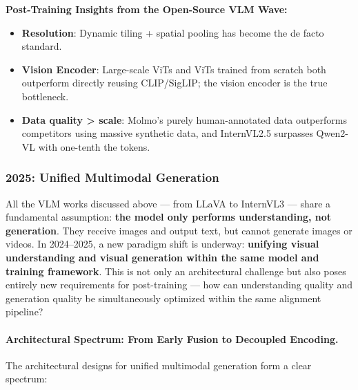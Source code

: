 \begin{solutionbox}
\textbf{Post-Training Insights from the Open-Source VLM Wave:}
\begin{itemize}[leftmargin=2em]
  \item \textbf{Resolution}: Dynamic tiling + spatial pooling has become the de facto standard.
  \item \textbf{Vision Encoder}: Large-scale ViTs and ViTs trained from scratch
    both outperform directly reusing CLIP/SigLIP; the vision encoder is the true bottleneck.
  \item \textbf{Data quality > scale}: Molmo's purely human-annotated data outperforms competitors using massive synthetic data,
    and InternVL2.5 surpasses Qwen2-VL with one-tenth the tokens.
\end{itemize}
\end{solutionbox}

\subsubsection{2025: Unified Multimodal Generation}
\label{sec:t5-unified-generation}

All the VLM works discussed above --- from LLaVA to InternVL3 ---
share a fundamental assumption: \textbf{the model only performs understanding, not generation}.
They receive images and output text, but cannot generate images or videos.
In 2024--2025, a new paradigm shift is underway:
\textbf{unifying visual understanding and visual generation within the same model and training framework}.
This is not only an architectural challenge but also poses entirely new requirements for post-training ---
how can understanding quality and generation quality be simultaneously optimized within the same alignment pipeline?

\paragraph{Architectural Spectrum: From Early Fusion to Decoupled Encoding.}
The architectural designs for unified multimodal generation form a clear spectrum:

